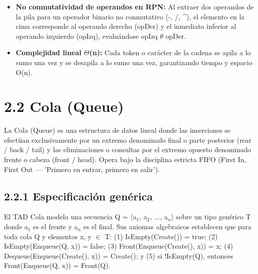 \documentclass[11pt,letterpaper]{article}
\begin{document}
\begin{itemize}
\setlength{\itemsep}{2pt}\setlength{\parskip}{0pt}
  \item \textbf{No conmutatividad de operandos en RPN: }Al extraer dos operandos de la pila para un operador binario no conmutativo (-, /, \textasciicircum{}), el elemento en la cima corresponde al operando derecho (opDer) y el inmediato inferior al operando izquierdo (opIzq), evaluándose opIzq $\theta$ opDer.
  \item \textbf{Complejidad lineal $\Theta$(n): }Cada token o carácter de la cadena se apila a lo sumo una vez y se desapila a lo sumo una vez, garantizando tiempo y espacio O(n).
\end{itemize}
\section*{2.2 Cola (Queue)}
La Cola (Queue) es una estructura de datos lineal donde las inserciones se efectúan exclusivamente por un extremo denominado final o parte posterior (rear / back / tail) y las eliminaciones o consultas por el extremo opuesto denominado frente o cabeza (front / head). Opera bajo la disciplina estricta FIFO (First In, First Out — 'Primero en entrar, primero en salir').\par
\subsection*{2.2.1 Especificación genérica}
El TAD Cola modela una secuencia Q = $\langle$a$_1$, a$_2$, ..., a$_n$$\rangle$ sobre un tipo genérico T donde a$_1$ es el frente y a$_n$ es el final. Sus axiomas algebraicos establecen que para toda cola Q y elementos x, y $\in$ T: (1) IsEmpty(Create()) = true; (2) IsEmpty(Enqueue(Q, x)) = false; (3) Front(Enqueue(Create(), x)) = x; (4) Dequeue(Enqueue(Create(), x)) = Create(); y (5) si !IsEmpty(Q), entonces Front(Enqueue(Q, x)) = Front(Q).\par
\end{document}
